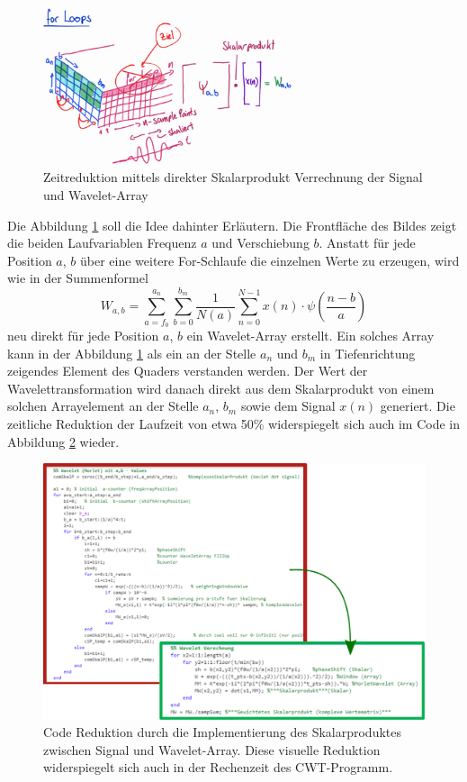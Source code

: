\begin{figure}
	\centering
	\includegraphics[width=0.65\textwidth]{papers/wavelets/images/14-1_EliminationForLoops.png}
	\caption{Zeitreduktion mittels direkter Skalarprodukt Verrechnung der Signal und Wavelet-Array}
	\label{wavelet:fig:EliminationForLoops}
\end{figure}

Die Abbildung \ref{wavelet:fig:EliminationForLoops} soll die Idee dahinter Erläutern. Die Frontfläche des Bildes zeigt die beiden Laufvariablen Frequenz $a$ und Verschiebung $b$. Anstatt für jede Position $a$, $b$ über eine weitere For-Schlaufe die einzelnen Werte zu erzeugen, wird wie in der Summenformel \[W_{a,b}=\sum_{a=f_0}^{a_n}\sum_{b=0}^{b_m}\frac{1}{N(a)}\sum_{n=0}^{N-1} x(n)\cdot\psi\left(\frac{n-b}{a}\right)\] neu direkt für jede Position $a$, $b$ ein Wavelet-Array erstellt. Ein solches Array kann in der Abbildung \ref{wavelet:fig:EliminationForLoops} als ein an der Stelle $a_n$ und $b_m$ in Tiefenrichtung zeigendes Element des Quaders verstanden werden. Der Wert der Wavelettransformation wird danach direkt aus dem Skalarprodukt von einem solchen Arrayelement an der Stelle $a_n$, $b_m$ sowie dem Signal $x(n)$ generiert.
Die zeitliche Reduktion der Laufzeit von etwa 50\% widerspiegelt sich auch im Code in Abbildung \ref{wavelet:fig:EliminationForLoopCode} wieder.

\begin{figure}
	\centering
	\includegraphics[width=\textwidth]{papers/wavelets/images/14-2_CodeSkalarProd.png}
	\caption{Code Reduktion durch die Implementierung des Skalarproduktes zwischen Signal und Wavelet-Array. Diese visuelle Reduktion widerspiegelt sich auch in der Rechenzeit des CWT-Programm.}
	\label{wavelet:fig:EliminationForLoopCode}
\end{figure}

